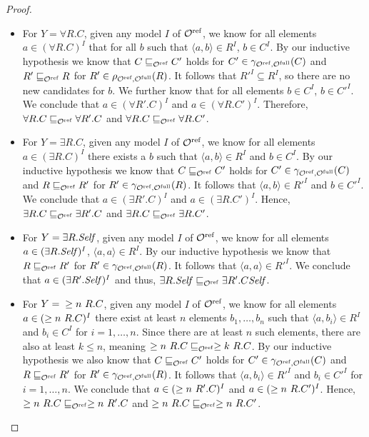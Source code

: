 \begin{proof}
\begin{itemize}
  \item For $Y = \forall R.C$, given any model $I$ of ${\mathcal{O}^\textnormal{ref}}$, we know for all elements $a \in (\forall R.C)^I$ that for all $b$ such that $\langle a, b \rangle \in R^I$, $b \in C^I$. By our inductive hypothesis we know that $C \sqsubseteq_{\mathcal{O}^\textnormal{ref}} C'$ holds for $C' \in \gamma_{{\mathcal{O}^\textnormal{ref}},{\mathcal{O}^\textnormal{full}}}(C)$ and $R' \sqsubseteq_{\mathcal{O}^\textnormal{ref}} R$ for $R' \in \rho_{{\mathcal{O}^\textnormal{ref}},{\mathcal{O}^\textnormal{full}}}(R)$. It follows that $R'^I \subseteq R^I$, so there are no new candidates for $b$. We further know that for all elements $b \in C^I$, $b \in C'^I$. We conclude that $a \in (\forall R'.C)^I$ and $a \in (\forall R.C')^I$. Therefore, $\forall R.C \sqsubseteq_{\mathcal{O}^\textnormal{ref}} \forall R'.C$ and $\forall R.C \sqsubseteq_{\mathcal{O}^\textnormal{ref}} \forall R.C'$.
  \item For $Y = \exists R.C$, given any model $I$ of ${\mathcal{O}^\textnormal{ref}}$, we know for all elements $a \in (\exists R.C)^I$ there exists a $b$ such that $\langle a, b \rangle \in R^I$ and $b \in C^I$. By our inductive hypothesis we know that $C \sqsubseteq_{\mathcal{O}^\textnormal{ref}} C'$ holds for $C' \in \gamma_{{\mathcal{O}^\textnormal{ref}},{\mathcal{O}^\textnormal{full}}}(C)$ and $R \sqsubseteq_{\mathcal{O}^\textnormal{ref}} R'$ for $R' \in \gamma_{{\mathcal{O}^\textnormal{ref}},{\mathcal{O}^\textnormal{full}}}(R)$. It follows that $\langle a, b \rangle \in R'^I$ and $b \in C'^I$. We conclude that $a \in (\exists R'.C)^I$ and $a \in (\exists R.C')^I$. Hence, $\exists R.C \sqsubseteq_{\mathcal{O}^\textnormal{ref}} \exists R'.C$ and $\exists R.C \sqsubseteq_{\mathcal{O}^\textnormal{ref}} \exists R.C'$.
  \item For $Y = \exists R.\mathit{Self}$, given any model $I$ of ${\mathcal{O}^\textnormal{ref}}$, we know for all elements $a \in (\exists R.\mathit{Self})^I$, $\langle a, a \rangle \in R^I$. By our inductive hypothesis we know that $R \sqsubseteq_{\mathcal{O}^\textnormal{ref}} R'$ for $R' \in \gamma_{{\mathcal{O}^\textnormal{ref}},{\mathcal{O}^\textnormal{full}}}(R)$. It follows that $\langle a, a \rangle \in R'^I$. We conclude that $a \in (\exists R'.\mathit{Self})^I$ and thus, $\exists R.\mathit{Self} \sqsubseteq_{\mathcal{O}^\textnormal{ref}} \exists R'.C\mathit{Self}$.
  \item For $Y ={} \geq n~R.C$, given any model $I$ of ${\mathcal{O}^\textnormal{ref}}$, we know for all elements $a \in (\geq n~R.C)^I$ there exist at least $n$ elements $b_1, \dots, b_n$ such that $\langle a, b_i \rangle \in R^I$ and $b_i \in C^I$ for $i = 1, \dots, n$. Since there are at least $n$ such elements, there are also at least $k \leq n$, meaning $\geq n~R.C \sqsubseteq_{\mathcal{O}^\textnormal{ref}} \geq k~R.C$. By our inductive hypothesis we also know that $C \sqsubseteq_{\mathcal{O}^\textnormal{ref}} C'$ holds for $C' \in \gamma_{{\mathcal{O}^\textnormal{ref}},{\mathcal{O}^\textnormal{full}}}(C)$ and $R \sqsubseteq_{\mathcal{O}^\textnormal{ref}} R'$ for $R' \in \gamma_{{\mathcal{O}^\textnormal{ref}},{\mathcal{O}^\textnormal{full}}}(R)$. It follows that $\langle a, b_i \rangle \in R'^I$ and $b_i \in C'^I$ for $i = 1, \dots, n$. We conclude that $a \in (\geq n~R'.C)^I$ and $a \in (\geq n~R.C')^I$. Hence, $\geq n~R.C \sqsubseteq_{\mathcal{O}^\textnormal{ref}} \geq n~R'.C$ and $\geq n~R.C \sqsubseteq_{\mathcal{O}^\textnormal{ref}} \geq n~R.C'$.

\end{itemize}
\end{proof}

